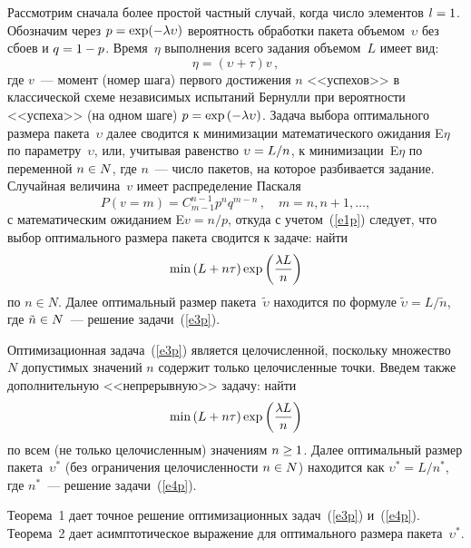 \begin{multicols}{2}
     Рассмотрим сначала более простой частный случай, когда число 
элементов $l\hm=1$. Обозначим через $p\hm=\exp (-\lambda \upsilon)$ 
вероятность обработки пакета объемом~$\upsilon$ без сбоев и $q\hm=1-p$. 
Время~$\eta$ выполнения всего задания объемом~$L$ имеет вид:
     \begin{equation}
     \eta=(\upsilon+\tau) v\,,
     \label{e1p}
     \end{equation}
где $v$~--- момент (номер шага) первого достижения $n$ <<успехов>> в 
классической схеме независимых ис\-пытаний Бернулли при вероятности 
<<успеха>> (на\linebreak
одном шаге) $p\hm=\exp\left( -\lambda \upsilon\right)$. Задача 
выбора оп\-тимального размера пакета~$\upsilon$ далее сводится к 
минимизации математического ожидания E$\eta$ по параметру~$\upsilon$, 
или, учитывая равенство $\upsilon\hm= L/n$, к\linebreak
 минимизации~E$\eta$ по 
переменной $n\hm\in N$, где $n$~---  чис\-ло пакетов, на которое разбивается 
задание. Случайная величина~$v$ имеет распределение Пас\-каля 
\begin{equation}
P\left( v=m\right) = C_{m-1}^{n-1} p^n q^{m-n}\,,\quad m=n, n+1, \ldots ,
\label{e2p}
\end{equation}
с математическим ожиданием E$v=n/p$, откуда с учетом~(\ref{e1p}) следует, 
что выбор оптимального размера пакета сводится к задаче: найти
\begin{equation}
\min \left( L+n\tau\right)\exp\left( \displaystyle\frac{\displaystyle \lambda L\mathstrut}{\displaystyle n\mathstrut}\right)
\label{e3p}
\end{equation}
по $n\in N$. Далее оптимальный размер пакета~$\tilde{\upsilon}$ 
находится по формуле $\tilde{\upsilon} =L/\tilde{n}$, где $\tilde{n}\hm\in 
N$~--- решение задачи~(\ref{e3p}). 
     
     Оптимизационная задача~(\ref{e3p}) является цело\-чис\-лен\-ной, 
поскольку множество $N$ допустимых значений $n$ содержит только 
целочисленные точки. Введем также дополнительную <<непрерывную>> 
задачу: найти
     \begin{equation}
     \min\left( L+n\tau\right) \exp \left( \displaystyle\frac{\displaystyle \lambda L\mathstrut}{\displaystyle n\mathstrut}\right)
     \label{e4p}
     \end{equation}
по всем (не только целочисленным) значениям $n\hm\geq 1$. Далее 
оптимальный размер пакета~$\upsilon^*$ (без ограничения целочисленности 
$n\hm\in N$) находится как $\upsilon^*=L/n^*$, где $n^*$~--- решение 
задачи~(\ref{e4p}).
     
Теорема~1 дает точное решение оптимизационных 
задач~(\ref{e3p}) и~(\ref{e4p}). Теорема~2 дает асимптотическое выражение 
для оптимального размера пакета~$\upsilon^*$.
     

\end{multicols}
